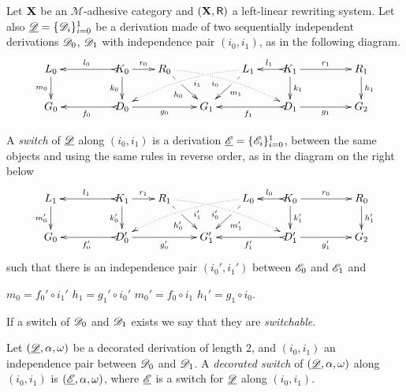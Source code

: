 \begin{definition}[Switch] \label{def:switch}
	Let $\textbf {\textup{X}}$ be an $\mathcal{M}$-adhesive category 
	and $(\textbf {\textup{X}}, \mathsf{R})$ a left-linear rewriting system. 
	Let also
	$\underline{\mathscr{D}}=\{\mathscr{D}_i\}_{i=0}^1$ be a derivation made
	of two sequentially independent derivations $\mathscr{D}_0$,
	$\mathscr{D}_1$ with independence pair $(i_0, i_1)$, as in the following diagram. 
		\[\xymatrix@R=20pt@C=20pt{L_0 \ar[d]_{m_0}&& K_0
		\ar[d]_{k_0}\ar@{>->}[ll]_{l_0} \ar[r]^{r_0} & R_0
		\ar@{.>}@/^.25cm/[drrr]|(.32)\hole_(.4){i_0}
		\ar[dr]|(.33)\hole_{h_0} && L_1 \ar@{.>}@/_.25cm/[dlll]^(.4){i_1}
		\ar[dl]|(.33)\hole^{m_1}& K_1 \ar[d]^{k_1}\ar@{>->}[l]_{l_1}
		\ar[rr]^{r_1} && R_1 \ar[d]^{h_1}\\G_0 && \ar@{>->}[ll]^{f_0}
		D_0 \ar[rr]_{g_0}&& G_1 && \ar@{>->}[ll]^{f_1} D_1
		\ar[rr]_{g_1}&& G_2}
	\]
	
	
	A \emph{switch} of $\underline{\mathscr{D}}$ along $(i_0,i_1)$ is
	a derivation $\underline{\mathscr{E}}=\{\mathscr{E}_i\}_{i=0}^1$, between the same objects and using the same rules
	in reverse order, as in the diagram on the right below
	\[
	\xymatrix@R=20pt@C=20pt{
		{L_1} \ar[d]_{m_0'}
		&&  {K_1} \ar@{>->}[ll]_{l_1} \ar[r]^{r_1} \ar[d]_{k_0'}
		&  {R_1} \ar[dr]|(.33)\hole_{h_0'}  \ar@/^.25cm/@{.>}_(.4){i_0'}|(.32)\hole[drrr]
		& & 
		{L_0}\ar[dl]|(.33)\hole^{m_1'} \ar@/_.25cm/@{.>}^(.4){i_1'}[dlll] 
		&  {K_0} \ar@{>->}[l]_{l_0} \ar[rr]^{r_0} \ar[d]^{k_1'}
		& & {R_0} \ar[d]^{h_1'} \\		
		{G_0}
		& & {D_0'} \ar@{>->}[ll]^{f_0'} \ar[rr]_{g_0'}
		& &  {G'_1} 
		& &  {D_1'} \ar@{>->}[ll]^{f_1'} \ar[rr]_{g_1'}
		& & {G_2}  }
	\]
	such that there is an independence pair $(i_0', i_1')$ between
	$\mathscr{E}_0$ and $\mathscr{E}_1$ and 
	\begin{center}   
		$m_0=f_0' \circ i_1'$
		\qquad $h_1=g_1' \circ i_0'$
		\qquad $m_0'= f_0 \circ i_1$
		\qquad $h_1'= g_{1}\circ i_0$.
	\end{center}
	
	If a switch of $\mathscr{D}_0$ and $\mathscr{D}_1$ exists we say that they are \emph{switchable}.
	
	
	Let $(\underline{\mathscr{D}}, \alpha, \omega)$ be a decorated derivation of length $2$, and $(i_0, i_1)$ an independence pair between $\mathscr{D}_0$ and $\mathscr{D}_1$. A \emph{decorated switch} of $(\underline{\mathscr{D}}, \alpha, \omega)$ along $(i_0, i_1)$ is $(\underline{\mathscr{E}}, \alpha, \omega)$, where $\underline{\mathscr{E}}$ is a switch for $\underline{\mathscr{D}}$ along $(i_0, i_1)$.
\end{definition}


